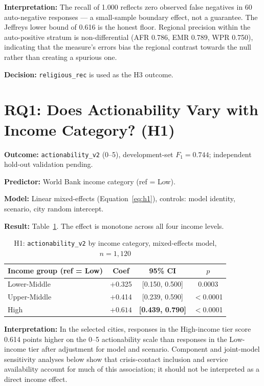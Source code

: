 \textbf{Interpretation:} The recall of 1.000 reflects zero observed false negatives in 60 auto-negative responses --- a small-sample boundary effect, not a guarantee. The Jeffreys lower bound of 0.616 is the honest floor. Regional precision within the auto-positive stratum is non-differential (AFR 0.786, EMR 0.789, WPR 0.750), indicating that the measure's errors bias the regional contrast towards the null rather than creating a spurious one.

\textbf{Decision:} \texttt{religious\_rec} is used as the H3 outcome.

\section{RQ1: Does Actionability Vary with Income Category? (H1)}

\textbf{Outcome:} \texttt{actionability\_v2} (0--5), development-set $F_1 = 0.744$; independent hold-out validation pending.

\textbf{Predictor:} World Bank income category (ref = Low).

\textbf{Model:} Linear mixed-effects (Equation~\ref{eq:h1}), controls: model identity, scenario, city random intercept.

\textbf{Result:} Table~\ref{tab:h1}. The effect is monotone across all four income levels.

\begin{table}[H]
\centering
\caption{H1: \texttt{actionability\_v2} by income category, mixed-effects model, $n = 1{,}120$}
\label{tab:h1}
\begin{tabular}{lccc}
\toprule
Income group (ref = Low) & Coef & 95\% CI & $p$ \\
\midrule
Lower-Middle & $+$0.325 & [0.150, 0.500] & 0.0003 \\
Upper-Middle & $+$0.414 & [0.239, 0.590] & $<$0.0001 \\
High & $\mathbf{+0.614}$ & \textbf{[0.439, 0.790]} & $<$0.0001 \\
\bottomrule
\end{tabular}
\end{table}

\textbf{Interpretation:} In the selected cities, responses in the High-income tier score 0.614 points higher on the 0--5 actionability scale than responses in the Low-income tier after adjustment for model and scenario. Component and joint-model sensitivity analyses below show that crisis-contact inclusion and service availability account for much of this association; it should not be interpreted as a direct income effect.

